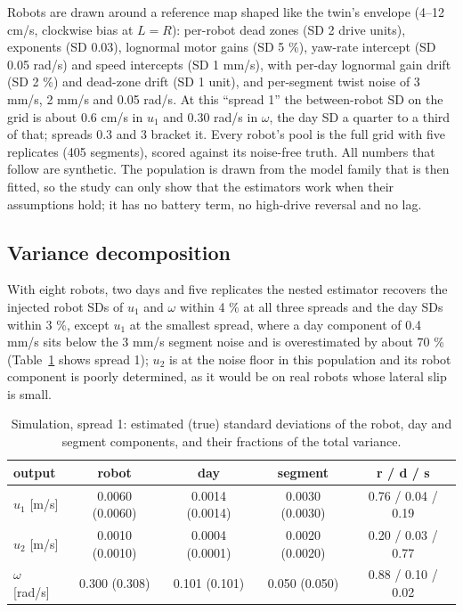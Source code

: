 Robots are drawn around a reference map shaped like the twin's envelope
(4--12 cm/s, clockwise bias at \(L = R\)): per-robot dead zones (SD 2
drive units), exponents (SD 0.03), lognormal motor gains (SD 5 \%),
yaw-rate intercept (SD 0.05 rad/s) and speed intercepts (SD 1 mm/s),
with per-day lognormal gain drift (SD 2 \%) and dead-zone drift (SD 1
unit), and per-segment twist noise of 3 mm/s, 2 mm/s and 0.05 rad/s. At
this ``spread 1'' the between-robot SD on the grid is about 0.6 cm/s in
\(u_1\) and 0.30 rad/s in \(\omega\), the day SD a quarter to a third
of that; spreads 0.3 and 3 bracket it. Every robot's pool is the full
grid with five replicates (405 segments), scored against its noise-free
truth. All numbers that follow are synthetic. The population is drawn
from the model family that is then fitted, so the study can only show
that the estimators work when their assumptions hold; it has no battery
term, no high-drive reversal and no lag.

\subsection{Variance decomposition}

With eight robots, two days and five replicates the nested estimator
recovers the injected robot SDs of \(u_1\) and \(\omega\) within 4 \%
at all three spreads and the day SDs within 3 \%, except \(u_1\) at
the smallest spread, where a day component of 0.4 mm/s sits below the
3 mm/s segment noise and is overestimated by about 70 \%
(Table~\ref{tab:1} shows spread 1); \(u_2\) is at the noise floor in
this population and its robot component is poorly determined, as it
would be on real robots whose lateral slip is small.

\begin{table}[t]
\caption{Simulation, spread 1: estimated (true) standard deviations of the robot, day and segment components, and their fractions of the total variance.}
\label{tab:1}
\centering\scriptsize\setlength{\tabcolsep}{3pt}
\begin{tabular}{lcccc}
\toprule
output & robot & day & segment & r / d / s \\
\midrule
\(u_1\) {[}m/s{]} & 0.0060 (0.0060) & 0.0014 (0.0014) & 0.0030 (0.0030) & 0.76 / 0.04 / 0.19 \\
\(u_2\) {[}m/s{]} & 0.0010 (0.0010) & 0.0004 (0.0001) & 0.0020 (0.0020) & 0.20 / 0.03 / 0.77 \\
\(\omega\) {[}rad/s{]} & 0.300 (0.308) & 0.101 (0.101) & 0.050 (0.050) & 0.88 / 0.10 / 0.02 \\
\bottomrule
\end{tabular}
\end{table}


